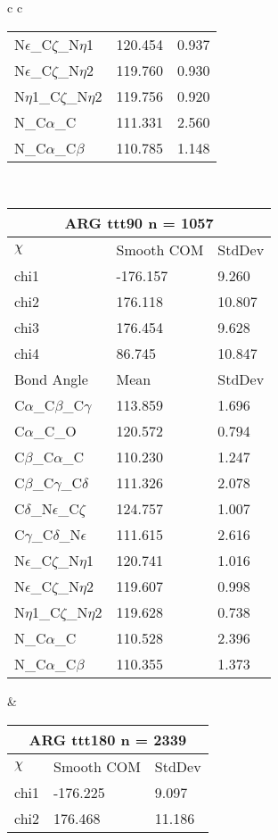\begin{longtable}{ c c }
\begin{tabular}{ l l l }
  N$\epsilon$\_C$\zeta$\_N$\eta$1 & 120.454 & 0.937\\
  N$\epsilon$\_C$\zeta$\_N$\eta$2 & 119.760 & 0.930\\
  N$\eta$1\_C$\zeta$\_N$\eta$2 & 119.756 & 0.920\\
  N\_C$\alpha$\_C & 111.331 & 2.560\\
  N\_C$\alpha$\_C$\beta$ & 110.785 & 1.148\\
  \bottomrule
  \end{tabular}
  \\
  \begin{tabular}{ l l l }
  \toprule
  \multicolumn{3}{c}{ARG \textbf{ttt90} n = 1057} \\ \toprule
  $\chi$       & Smooth COM & StdDev \\ \midrule
  chi1 & -176.157 & 9.260 \\ 
  chi2 & 176.118 & 10.807 \\ 
  chi3 & 176.454 & 9.628 \\ 
  chi4 & 86.745 & 10.847 \\ \midrule
  Bond Angle   & Mean     & StdDev \\ \midrule
  C$\alpha$\_C$\beta$\_C$\gamma$ & 113.859 & 1.696\\
  C$\alpha$\_C\_O & 120.572 & 0.794\\
  C$\beta$\_C$\alpha$\_C & 110.230 & 1.247\\
  C$\beta$\_C$\gamma$\_C$\delta$ & 111.326 & 2.078\\
  C$\delta$\_N$\epsilon$\_C$\zeta$ & 124.757 & 1.007\\
  C$\gamma$\_C$\delta$\_N$\epsilon$ & 111.615 & 2.616\\
  N$\epsilon$\_C$\zeta$\_N$\eta$1 & 120.741 & 1.016\\
  N$\epsilon$\_C$\zeta$\_N$\eta$2 & 119.607 & 0.998\\
  N$\eta$1\_C$\zeta$\_N$\eta$2 & 119.628 & 0.738\\
  N\_C$\alpha$\_C & 110.528 & 2.396\\
  N\_C$\alpha$\_C$\beta$ & 110.355 & 1.373\\
  \bottomrule
  \end{tabular}
  &
  \begin{tabular}{ l l l }
  \toprule
  \multicolumn{3}{c}{ARG \textbf{ttt180} n = 2339} \\ \toprule
  $\chi$       & Smooth COM & StdDev \\ \midrule
  chi1 & -176.225 & 9.097 \\ 
  chi2 & 176.468 & 11.186 \\ 

\end{tabular}
\end{longtable}
